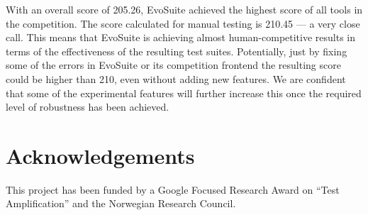 \documentclass[runningheads,a4paper]{llncs}
\newcommand{\EVOSUITE}{{\sc EvoSuite}\xspace}
\begin{document}
With an overall score of 205.26, \EVOSUITE achieved the highest score
of all tools in the competition. The score calculated for manual
testing is 210.45 --- a very close call. This means that \EVOSUITE is
achieving almost human-competitive results in terms of the
effectiveness of the resulting test suites. Potentially, just by
fixing some of the errors in \EVOSUITE or its competition frontend the
resulting score could be higher than 210, even without adding new
features. We are confident that some of the experimental features will
further increase this once the required level of robustness has been
achieved.

\section*{Acknowledgements}
This project has been funded by a Google
Focused Research Award on ``Test Amplification'' and the Norwegian
Research Council.



\end{document}

